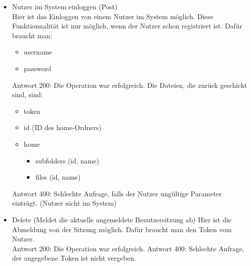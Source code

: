 \documentclass[a4paper,twoside]{article}
\begin{document}
\begin{enumerate}
\begin{itemize}
			\item Nutzer im System einloggen (Post) \\
			Hier ist das Einloggen von einem Nutzer im System m\"oglich. Diese Funktionnalit\"at ist nur m\"oglich, wenn der Nutzer schon registriert ist. Daf\"ur braucht man: 
			\begin{itemize}
				\item username 
				\item password
			\end{itemize}
			Antwort 200: Die Operation war erfolgreich. Die Dateien, die zur\"uck geschickt sind, sind:
			\begin{itemize}
				\item token
				\item id (ID des home-Ordners)
				\item home
				\begin{itemize}
					\item subfolders (id, name)
					\item files (id, name)
				\end{itemize}
			\end{itemize}
			Antwort 400: Schlechte Anfrage, falls der Nutzer ung\"ultige Parameter eintr\"agt. (Nutzer nicht im System)
			\item Delete (Meldet die aktuelle angemeldete Benutzersitzung ab)
			Hier ist die Abmeldung von der Sitzung m\"oglich. Daf\"ur braucht man den Token vom Nutzer. \\
			Antwort 200: Die Operation war erfolgreich. 
			Antwort 400: Schlechte Anfrage, der angegebene Token ist nicht vergeben.
		\end{itemize}
		

\end{enumerate}
\end{document}
